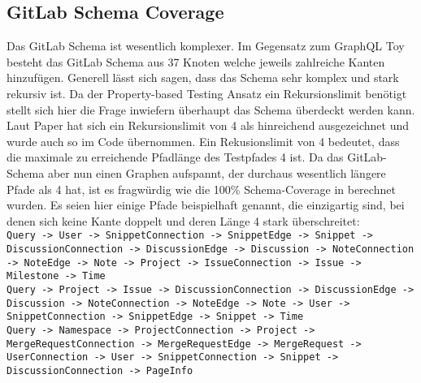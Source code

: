 \subsection{GitLab Schema Coverage}

Das GitLab Schema ist wesentlich komplexer.
Im Gegensatz zum GraphQL Toy besteht das GitLab Schema aus 37 Knoten welche jeweils zahlreiche Kanten hinzufügen.
Generell lässt sich sagen, dass das Schema sehr komplex und stark rekursiv ist. \cite[vgl. Studied Cases 2]{property-based-testing}
Da der Property-based Testing Ansatz ein Rekursionslimit benötigt stellt sich hier die Frage inwiefern überhaupt das Schema überdeckt werden kann.
Laut Paper hat sich ein Rekursionslimit von 4 als hinreichend ausgezeichnet \cite[vgl. Table 1 ]{property-based-testing} und wurde auch so
im Code übernommen.
Ein Rekusionslimit von 4 bedeutet, dass die maximale zu erreichende Pfadlänge des Testpfades 4 ist.
Da das GitLab-Schema aber nun einen Graphen aufspannt, der durchaus wesentlich längere Pfade als 4 hat, ist es fragwürdig wie die 100\% Schema-Coverage
in \cite[Table 1]{property-based-testing} berechnet wurden.
Es seien hier einige Pfade beispielhaft genannt, die einzigartig sind, bei denen sich keine Kante doppelt und deren Länge 4 stark überschreitet: \\

\verb+Query -> User -> SnippetConnection -> SnippetEdge -> Snippet -> DiscussionConnection -> DiscussionEdge -> Discussion -> NoteConnection -> NoteEdge -> Note -> Project -> IssueConnection -> Issue -> Milestone -> Time+ \\
\verb+Query -> Project -> Issue -> DiscussionConnection -> DiscussionEdge -> Discussion -> NoteConnection -> NoteEdge -> Note -> User -> SnippetConnection -> SnippetEdge -> Snippet -> Time+ \\
\verb+Query -> Namespace -> ProjectConnection -> Project -> MergeRequestConnection -> MergeRequestEdge -> MergeRequest -> UserConnection -> User -> SnippetConnection -> Snippet -> DiscussionConnection -> PageInfo+ \\

